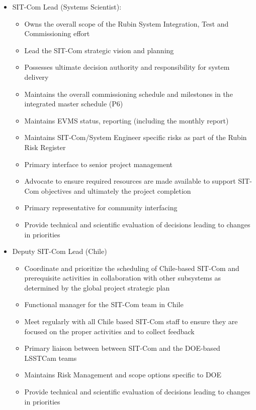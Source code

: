 \documentclass[SE,lsstdraft,authoryear,toc]{lsstdoc}
\begin{document}
\begin{itemize}
    \item SIT-Com Lead (Systems Scientist):
    \begin{itemize}
        \item Owns the overall scope of the Rubin System Integration, Test and Commissioning effort
        \item Lead the SIT-Com strategic vision and planning
        \item Possesses ultimate decision authority and responsibility for system delivery
        \item Maintains the overall commissioning schedule and milestones in the integrated master schedule (P6)
        \item Maintains EVMS status, reporting (including the monthly report)
        \item Maintains SIT-Com/System Engineer specific risks as part of the Rubin Risk Register
        \item Primary interface to senior project management
        \item Advocate to ensure required resources are made available to support SIT-Com objectives and ultimately the project completion
        \item Primary representative for community interfacing
        \item Provide technical and scientific evaluation of decisions leading to changes in priorities
    \end{itemize}
    \item Deputy SIT-Com Lead (Chile)
    \begin{itemize}
        \item Coordinate and prioritize the scheduling of Chile-based SIT-Com and prerequisite activities in collaboration with other subsystems as determined by the global project strategic plan
        \item Functional manager for the SIT-Com team in Chile
        \item Meet regularly with all Chile based SIT-Com staff to ensure they are focused on the proper activities and to collect feedback
        \item Primary liaison between between SIT-Com and the DOE-based LSSTCam teams
        \item Maintains Risk Management and scope options specific to DOE
        \item Provide technical and scientific evaluation of decisions leading to changes in priorities

\end{itemize}
\end{itemize}
\end{document}
